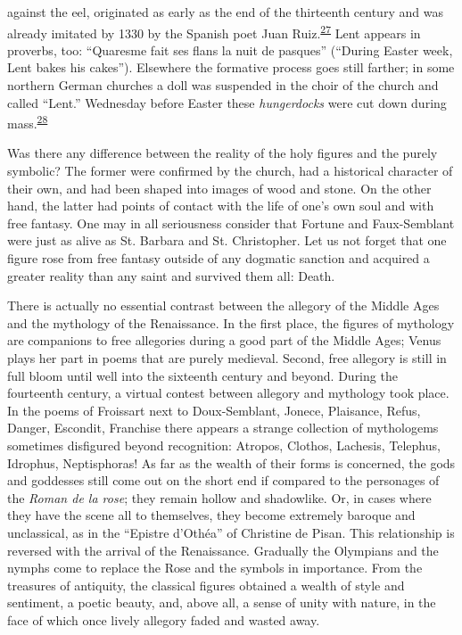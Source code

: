 against the eel, originated as early as the end of the thirteenth
century and was already imitated by 1330 by the Spanish poet Juan
Ruiz.\textsuperscript{\protect\hypertarget{16_Chapter_Nine__THE_DECLINE_OF_SYM.xhtmlux5cux23id_740}{\protect\hyperlink{23_NOTES.xhtmlux5cux23id_741}{27}}}
Lent appears in proverbs, too: ``Quaresme fait ses flans la nuit de
pasques'' (``During Easter week, Lent bakes his cakes''). Elsewhere the
formative process goes still farther; in some northern German churches a
doll was suspended in the choir of the church and called ``Lent.''
Wednesday before Easter these \emph{hungerdocks} were cut down during
mass.\textsuperscript{\protect\hypertarget{16_Chapter_Nine__THE_DECLINE_OF_SYM.xhtmlux5cux23id_738}{\protect\hyperlink{23_NOTES.xhtmlux5cux23id_739}{28}}}

Was there any difference between the reality of the holy figures and the
purely symbolic? The former were confirmed by the church, had a
historical character of their own, and had been shaped into images of
wood and stone. On the other hand, the latter had points of contact with
the life of one's own soul and with free fantasy. One may in all
seriousness consider that Fortune and Faux-Semblant were just as alive
as St. Barbara and St. Christopher. Let us not forget that one figure
rose from free fantasy outside of any dogmatic sanction and acquired a
greater reality than any saint and survived them all: Death.

There is actually no essential contrast between the allegory of the
Middle Ages and the mythology of the Renaissance. In the first place,
the figures of mythology are companions to free allegories
\protect\hypertarget{16_Chapter_Nine__THE_DECLINE_OF_SYM.xhtmlux5cux23page_247}{}{}during
a good part of the Middle Ages; Venus plays her part in poems that are
purely medieval. Second, free allegory is still in full bloom until well
into the sixteenth century and beyond. During the fourteenth century, a
virtual contest between allegory and mythology took place. In the poems
of Froissart next to Doux-Semblant, Jonece, Plaisance, Refus, Danger,
Escondit, Franchise there appears a strange collection of mythologems
sometimes disfigured beyond recognition: Atropos, Clothos, Lachesis,
Telephus, Idrophus, Neptisphoras! As far as the wealth of their forms is
concerned, the gods and goddesses still come out on the short end if
compared to the personages of the \emph{Roman de la rose}; they remain
hollow and shadowlike. Or, in cases where they have the scene all to
themselves, they become extremely baroque and unclassical, as in the
``Epistre d'Othéa'' of Christine de Pisan. This relationship is reversed
with the arrival of the Renaissance. Gradually the Olympians and the
nymphs come to replace the Rose and the symbols in importance. From the
treasures of antiquity, the classical figures obtained a wealth of style
and sentiment, a poetic beauty, and, above all, a sense of unity with
nature, in the face of which once lively allegory faded and wasted away.

